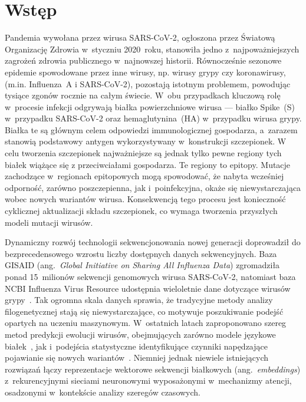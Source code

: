 \newpage
\section{Wstęp}

Pandemia wywołana przez wirusa SARS-CoV-2, ogłoszona przez Światową Organizację Zdrowia w~styczniu 2020~roku, stanowiła jedno z~najpoważniejszych zagrożeń zdrowia publicznego w~najnowszej historii. Równocześnie sezonowe epidemie spowodowane przez inne wirusy, np. wirusy grypy czy koronawirusy, (m.in. Influenza~A i SARS-CoV-2), pozostają istotnym problemem, powodując tysiące zgonów rocznie na całym świecie. W~obu przypadkach kluczową rolę w~procesie infekcji odgrywają białka powierzchniowe wirusa --- białko Spike~(S) w~przypadku SARS-CoV-2 oraz hemaglutynina~(HA) w~przypadku wirusa grypy. Białka te są głównym celem odpowiedzi immunologicznej gospodarza, a~zarazem stanowią podstawowy antygen wykorzystywany w~konstrukcji szczepionek. W celu tworzenia szczepionek najważniejsze są jednak tylko pewne regiony tych białek wiążące się z przeciwciałami gospodarza. Te regiony to epitopy. Mutacje zachodzące w~regionach epitopowych mogą spowodować, że nabyta wcześniej odporność, zarówno poszczepienna, jak i~poinfekcyjna, okaże się niewystarczająca wobec nowych wariantów wirusa. Konsekwencją tego procesu jest konieczność cyklicznej aktualizacji składu szczepionek, co wymaga tworzenia przyszłych modeli mutacji wirusów.\cite{walls2020spike, bush1999influenza,mattiuzzi2023influenza, harvey2021variants,golab2007viruses}

Dynamiczny rozwój technologii sekwencjonowania nowej generacji doprowadził do bezprecedensowego wzrostu liczby dostępnych danych sekwencyjnych. Baza GISAID (ang.~\textit{Global Initiative on Sharing All Influenza Data}) zgromadziła ponad 15~milionów sekwencji genomowych wirusa SARS-CoV-2, natomiast baza NCBI Influenza Virus Resource udostępnia wieloletnie dane dotyczące wirusów grypy~\cite{elbe2017gisaid, bao2008ncbi}. Tak ogromna skala danych sprawia, że tradycyjne metody analizy filogenetycznej stają się niewystarczające, co motywuje poszukiwanie podejść opartych na uczeniu maszynowym. W~ostatnich latach zaproponowano szereg metod predykcji ewolucji wirusów, obejmujących zarówno modele językowe białek~\cite{hie2021viral}, jak i~podejścia statystyczne identyfikujące czynniki napędzające pojawianie się nowych wariantów~\cite{maher2022predicting}. Niemniej jednak niewiele istniejących rozwiązań łączy reprezentacje wektorowe sekwencji białkowych (ang.~\textit{embeddings}) z~rekurencyjnymi sieciami neuronowymi wyposażonymi w~mechanizmy atencji, osadzonymi w~kontekście analizy szeregów czasowych.

